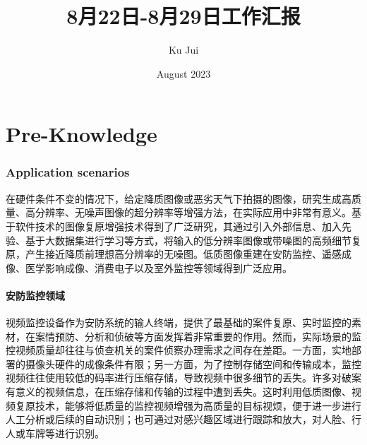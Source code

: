 \documentclass[letterpaper,10pt]{article}
\begin{document}
	
	
	\title{\songti {}8月22日-8月29日工作汇报}
	\author{\textrm{Ku Jui}}
	\date{\textrm{August 2023}}
	\maketitle
	
	\renewcommand{\figurename}{Figure} %
	\renewcommand{\contentsname}{Contents}
	\renewcommand{\tablename}{Table}
	\tableofcontents  %
	
	\part{Pre-Knowledge}
	
	\section{Application scenarios}
	
	在硬件条件不变的情况下，给定降质图像或恶劣天气下拍摄的图像，研究生成高质量、高分辨率、无噪声图像的超分辨率等增强方法，在实际应用中非常有意义。基于软件技术的图像复原增强技术得到了广泛研究，其通过引入外部信息、加入先验、基于大数据集进行学习等方式，将输入的低分辨率图像或带噪图的高频细节复原，产生接近降质前理想高分辨率的无噪图。低质图像重建在安防监控、遥感成像、医学影响成像、消费电子以及室外监控等领域得到广泛应用。
	
		\subsection{安防监控领域}
		
		视频监控设备作为安防系统的输人终端，提供了最基础的案件复原、实时监控的素材，在案情预防、分析和侦破等方面发挥着非常重要的作用。然而，实际场景的监控视频质量却往往与侦查机关的案件侦察办理需求之间存在差距。一方面，实地部署的摄像头硬件的成像条件有限；另一方面，为了控制存储空间和传输成本，监控视频往往使用较低的码率进行压缩存储，导致视频中很多细节的丢失。许多对破案有意义的视频信息，在压缩存储和传输的过程中遭到丢失。这时利用低质图像、视频复原技术，能够将低质量的监控视频增强为高质量的目标视烦，便于进一步进行人工分析或后续的自动识别；也可通过对感兴趣区域进行跟踪和放大，对人脸、行人或车牌等进行识别。
		
\end{document}
